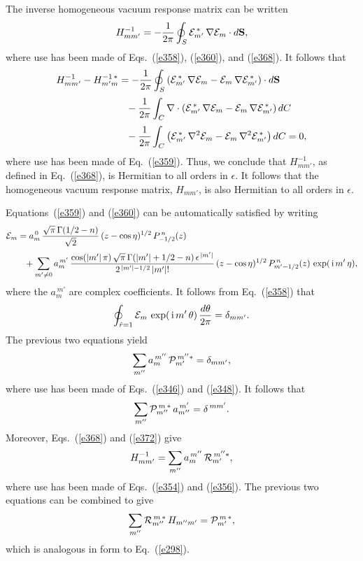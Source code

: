 \documentclass[12pt,prb,aps]{revtex4-1}
\begin{document}
The inverse homogeneous vacuum response matrix can be written
\begin{equation}\label{e369}
H_{mm'}^{-1} =-\frac{1}{2\pi}\oint_S {\cal E}_{m'}^{\,\ast}\,\nabla{\cal E}_m\cdot d{\bf S},
\end{equation}
where use has been made of Eqs.~(\ref{e358}), (\ref{e360}), and (\ref{e368}). It follows that
\begin{align}\label{e370}
H_{mm'}^{-1}-H_{m'm}^{-1\,\ast} &= -\frac{1}{2\pi}\oint_S\left({\cal E}_{m'}^{\,\ast}\,\nabla{\cal E}_m-{\cal E}_m\,\nabla{\cal E}_{m'}^{\,\ast}\right)\cdot
d{\bf S}\nonumber\\[0.5ex]
&\phantom{=}-\frac{1}{2\pi}\int_C\nabla\cdot\left({\cal E}_{m'}^{\,\ast}\,\nabla{\cal E}_m-{\cal E}_m\,\nabla{\cal E}_{m'}^{\,\ast}\right)dC\nonumber\\[0.5ex]
&\phantom{=}-\frac{1}{2\pi}\int_C\left({\cal E}_{m'}^{\,\ast}\,\nabla^2{\cal E}_m-{\cal E}_m\,\nabla^2{\cal E}_{m'}^{\,\ast}\right)dC=0,
\end{align}
where use has been made of Eq.~(\ref{e359}). Thus, we conclude that $H_{mm'}^{-1}$, as defined in Eq.~(\ref{e368}), is   Hermitian  to all orders in $\epsilon$. It follows that the homogeneous vacuum response matrix, $H_{mm'}$, is also Hermitian to all orders in $\epsilon$. 

Equations~(\ref{e359}) and (\ref{e360}) can be automatically satisfied by writing
\begin{align}\label{e372}
{\cal E}_m&= a_m^{\,0}\,\frac{\sqrt{\pi}\,\Gamma(1/2-n)}{\sqrt{2}}\,(z-\cos\eta)^{1/2}\,P_{-1/2}^{\,n}(z)\\[0.5ex]
&\phantom{=}+ \sum_{m'\neq 0} a_{m}^{\,m'}\,\frac{\cos(|m'|\,\pi)\,\sqrt{\pi}\,\Gamma(|m'|+1/2-n)\,\epsilon^{\,|m'|}}{2^{\,|m'|-1/2}\,|m'|!}\,
(z-\cos\eta)^{1/2}\,P_{m'-1/2}^{\,n}(z)\,\exp(\,{\rm i}\,m'\,\eta),\nonumber
\end{align}
where the $a_m^{\,m'}$ are complex coefficients. 
It follows from Eq.~(\ref{e358}) that
\begin{equation}
\oint_{\hat{r}=1}{\cal E}_m\,\exp(\,{\rm i}\,m'\,\theta)\,\frac{d\theta}{2\pi} = \delta_{mm'}.
\end{equation}
The previous two equations yield
\begin{equation}
\sum_{m''}a_m^{\,m''}\,{\cal P}_{m'}^{\,m''\ast}= \delta_{mm'},
\end{equation}
where use has been made of Eqs.~(\ref{e346}) and (\ref{e348}). 
It follows that 
\begin{equation}
\sum_{m''}{\cal P}_{m''}^{\,m\,\ast}\,a_{m''}^{\,m'}= \delta^{\,mm'}.
\end{equation}
Moreover, Eqs.~(\ref{e368}) and (\ref{e372}) give
\begin{equation}
H_{mm'}^{-1} = \sum_{m''}a_m^{\,m''}\,{\cal R}_{m'}^{\,m''\ast},
\end{equation}
where use has been made of Eqs.~(\ref{e354}) and (\ref{e356}). The previous two equations can be combined to give
\begin{equation}\label{e376}
\sum_{m''}{\cal R}_{m''}^{\,m\,\ast}\,H_{m''m'}={\cal P}_{m'}^{\,m\,\ast},
\end{equation}
which is analogous in form to Eq.~(\ref{e298}). 
\end{document}
